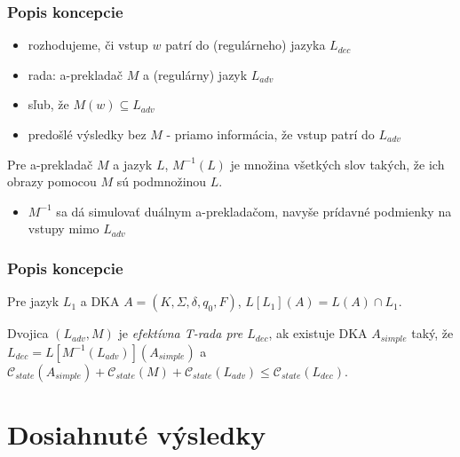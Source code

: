\documentclass[slovak]{beamer}
\begin{document}
\begin{frame}
\frametitle{Popis koncepcie}

\begin{itemize}
\item rozhodujeme, či vstup $w$ patrí do (regulárneho) jazyka $L_{dec}$
\item rada: a-prekladač $M$ a (regulárny) jazyk $L_{adv}$
\item sľub, že $M(w) \subseteq L_{adv}$
\item predošlé výsledky bez $M$ - priamo informácia, že vstup patrí do $L_{adv}$
\end{itemize}

\begin{definition}
Pre a-prekladač $M$ a jazyk $L$, $M^{-1}(L)$ je množina všetkých slov takých, že ich obrazy pomocou $M$ sú podmnožinou $L$.
\end{definition}

\begin{itemize}
\item $M^{-1}$ sa dá simulovať duálnym a-prekladačom, navyše prídavné podmienky na vstupy mimo $L_{adv}$
\end{itemize}

\end{frame}

\begin{frame}
\frametitle{Popis koncepcie}

\begin{definition}
Pre jazyk $L_1$ a DKA $A = (K, \Sigma, \delta, q_0, F)$, $L[L_1](A) = L(A) \cap L_1$.
\end{definition}

\begin{definition}
Dvojica $(L_{adv},M)$ je \emph{efektívna T-rada pre $L_{dec}$}, ak existuje DKA $A_{simple}$ taký, že $L_{dec} = L[M^{-1}(L_{adv})](A_{simple})$ a $\mathcal{C}_{state}(A_{simple}) + \mathcal{C}_{state}(M) + \mathcal{C}_{state}(L_{adv}) \leq \mathcal{C}_{state}(L_{dec})$.
\end{definition}

\end{frame}

\section{Dosiahnuté výsledky}
\end{document}

